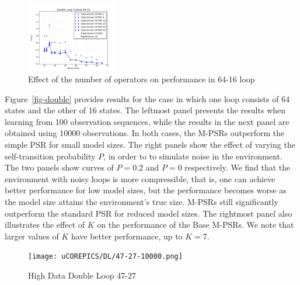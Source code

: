 \begin{figure}[ht!]
\centering
\includegraphics[width=40mm]{uCOREPICS/DL/NumOpsTiming.png}\vspace*{-4mm}
\caption{Effect of the number of operators on performance in 64-16 loop\label{fig-numops}\vspace*{-4mm}}
\end{figure} 



Figure~\ref{fig-double} provides results for the case in which one loop consists of 64 states and the other of 16 states. The leftmost panel presents the results when learning from  100 observation sequences, while the results in the next panel are obtained using 10000 observations. In both cases, the M-PSRs  outperform the simple PSR for small model sizes. The right panels show the effect of 
varying the self-transition probability $P$, in order to to simulate noise in the environment. The two panels show curves of $P=0.2$ and $P=0$ respectively. We find that the environment with noisy loops is more compressible, that is, one can achieve better performance for low model sizes, but the performance becomes worse as the model size attains the environment's true size. M-PSRs still significantly outperform the standard PSR for reduced model sizes.  The rightmost panel also illustrates the effect of $K$ on the performance of the Base M-PSRs. We note that larger values of $K$ have better performance, up to $K=7$.

\begin{figure}[ht!]
\centering
\texttt{[image: uCOREPICS/DL/47-27-10000.png]}\vspace*{-4mm}
\caption{High Data Double Loop 47-27\label{fig-dl47}\vspace*{-4mm}}
\end{figure}



